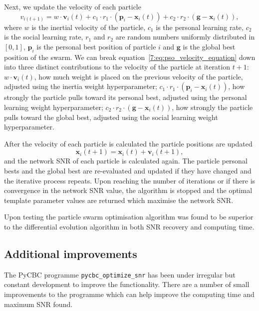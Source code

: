 Next, we update the velocity of each particle
%
\begin{equation}
    v_{i(t+1)} = w \cdot \mathbf{v}_i(t) + c_1 \cdot r_1 \cdot (\mathbf{p}_i - \mathbf{x}_i(t)) + c_2 \cdot r_2 \cdot (\mathbf{g} - \mathbf{x}_i(t)),
    \label{7:eq:pso_velocity_equation}
\end{equation}
%
where $w$ is the inertial velocity of the particle, $c_{1}$ is the personal learning rate, $c_{2}$ is the social learning rate, $r_{1}$ and $r_{2}$ are random numbers uniformly distributed in $\left[0, 1\right]$, $\textbf{p}_{i}$ is the personal best position of particle $i$ and $\textbf{g}$ is the global best position of the swarm. We can break equation~\ref{7:eq:pso_velocity_equation} down into three distinct contributions to the velocity of the particle at iteration $t + 1$: $w \cdot \textbf{v}_{i}(t)$, how much weight is placed on the previous velocity of the particle, adjusted using the inertia weight hyperparameter; $c_{1} \cdot r_{1} \cdot \left(\textbf{p}_{i} - \textbf{x}_{i}(t)\right)$, how strongly the particle pulls toward its personal best, adjusted using the personal learning weight hyperparameter; $c_{2} \cdot r_{2} \cdot \left(\textbf{g} - \textbf{x}_{i}(t)\right)$, how strongly the particle pulls toward the global best, adjusted using the social learning weight hyperparameter.

After the velocity of each particle is calculated the particle positions are updated
%
\begin{equation}
    \mathbf{x}_i(t+1) = \mathbf{x}_i(t) + \mathbf{v}_i(t+1),
\end{equation}
%
and the network SNR of each particle is calculated again. The particle personal bests and the global best are re-evaluated and updated if they have changed and the iterative process repeats. Upon reaching the number of iterations or if there is convergence in the network SNR value, the algorithm is stopped and the optimal template parameter values are returned which maximise the network SNR.

Upon testing the particle swarm optimisation algorithm was found to be superior to the differential evolution algorithm in both SNR recovery and computing time.

\subsection{\label{7:sec:additional-improvements}Additional improvements}

The PyCBC programme \texttt{pycbc\_optimize\_snr} has been under irregular but constant development to improve the functionality. There are a number of small improvements to the programme which can help improve the computing time and maximum SNR found.

